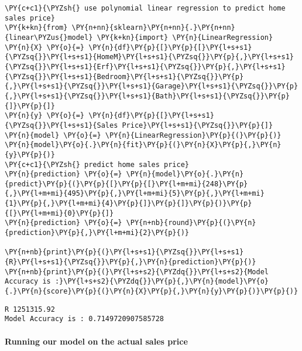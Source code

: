     \begin{tcolorbox}[breakable, size=fbox, boxrule=1pt, pad at break*=1mm,colback=cellbackground, colframe=cellborder]
\begin{Verbatim}[commandchars=\\\{\}]
\PY{c+c1}{\PYZsh{} use polynomial linear regression to predict home sales price}
\PY{k+kn}{from} \PY{n+nn}{sklearn}\PY{n+nn}{.}\PY{n+nn}{linear\PYZus{}model} \PY{k+kn}{import} \PY{n}{LinearRegression}
\PY{n}{X} \PY{o}{=} \PY{n}{df}\PY{p}{[}\PY{p}{[}\PY{l+s+s1}{\PYZsq{}}\PY{l+s+s1}{HomeM}\PY{l+s+s1}{\PYZsq{}}\PY{p}{,}\PY{l+s+s1}{\PYZsq{}}\PY{l+s+s1}{Erf}\PY{l+s+s1}{\PYZsq{}}\PY{p}{,}\PY{l+s+s1}{\PYZsq{}}\PY{l+s+s1}{Bedroom}\PY{l+s+s1}{\PYZsq{}}\PY{p}{,}\PY{l+s+s1}{\PYZsq{}}\PY{l+s+s1}{Garage}\PY{l+s+s1}{\PYZsq{}}\PY{p}{,}\PY{l+s+s1}{\PYZsq{}}\PY{l+s+s1}{Bath}\PY{l+s+s1}{\PYZsq{}}\PY{p}{]}\PY{p}{]}
\PY{n}{y} \PY{o}{=} \PY{n}{df}\PY{p}{[}\PY{l+s+s1}{\PYZsq{}}\PY{l+s+s1}{Sales Price}\PY{l+s+s1}{\PYZsq{}}\PY{p}{]}
\PY{n}{model} \PY{o}{=} \PY{n}{LinearRegression}\PY{p}{(}\PY{p}{)}
\PY{n}{model}\PY{o}{.}\PY{n}{fit}\PY{p}{(}\PY{n}{X}\PY{p}{,}\PY{n}{y}\PY{p}{)}
\PY{c+c1}{\PYZsh{} predict home sales price}
\PY{n}{prediction} \PY{o}{=} \PY{n}{model}\PY{o}{.}\PY{n}{predict}\PY{p}{(}\PY{p}{[}\PY{p}{[}\PY{l+m+mi}{248}\PY{p}{,}\PY{l+m+mi}{495}\PY{p}{,}\PY{l+m+mi}{5}\PY{p}{,}\PY{l+m+mi}{1}\PY{p}{,}\PY{l+m+mi}{4}\PY{p}{]}\PY{p}{]}\PY{p}{)}\PY{p}{[}\PY{l+m+mi}{0}\PY{p}{]}
\PY{n}{prediction} \PY{o}{=} \PY{n+nb}{round}\PY{p}{(}\PY{n}{prediction}\PY{p}{,}\PY{l+m+mi}{2}\PY{p}{)}

\PY{n+nb}{print}\PY{p}{(}\PY{l+s+s1}{\PYZsq{}}\PY{l+s+s1}{R}\PY{l+s+s1}{\PYZsq{}}\PY{p}{,}\PY{n}{prediction}\PY{p}{)}
\PY{n+nb}{print}\PY{p}{(}\PY{l+s+s2}{\PYZdq{}}\PY{l+s+s2}{Model Accuracy is :}\PY{l+s+s2}{\PYZdq{}}\PY{p}{,}\PY{n}{model}\PY{o}{.}\PY{n}{score}\PY{p}{(}\PY{n}{X}\PY{p}{,}\PY{n}{y}\PY{p}{)}\PY{p}{)}
\end{Verbatim}
\end{tcolorbox}

    \begin{Verbatim}[commandchars=\\\{\}]
R 1251315.92
Model Accuracy is : 0.7149720907585728
    \end{Verbatim}

    \hypertarget{running-our-model-on-the-actual-sales-price}{%
\paragraph{Running our model on the actual sales
price}\label{running-our-model-on-the-actual-sales-price}}

